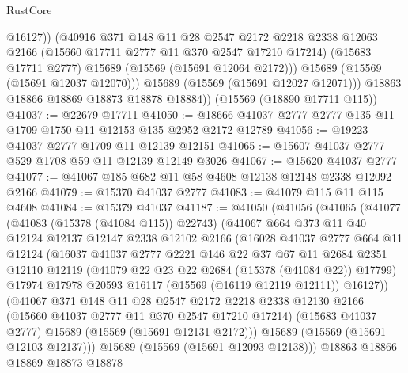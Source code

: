 \begin{lexlean}{RustCore}
\begin{coremodule}
                @16127))
            (@40916
              @371
              @148
              @11
              @28
              @2547
              @2172
              @2218
              @2338
              @12063
              @2166
              (@15660 @17711 @2777 @11 @370 @2547 @17210 @17214)
              (@15683 @17711 @2777)
              @15689
              (@15569 (@15691 @12064 @2172)))
            @15689
            (@15569 (@15691 @12037 @12070)))
          @15689
          (@15569 (@15691 @12027 @12071)))
        @18863
        @18866
        @18869
        @18873
        @18878
        @18884))
    (@15569 (@18890 @17711 @115))
@41037 := @22679 @17711
@41050 := @18666 @41037 @2777 @2777 @135 @11 @1709 @1750 @11 @12153 @135 @2952 @2172 @12789
@41056 := @19223 @41037 @2777 @1709 @11 @12139 @12151
@41065 := @15607 @41037 @2777 @529 @1708 @59 @11 @12139 @12149 @3026
@41067 := @15620 @41037 @2777
@41077 := @41067 @185 @682 @11 @58 @4608 @12138 @12148 @2338 @12092 @2166
@41079 := @15370 @41037 @2777
@41083 := @41079 @115 @11 @115 @4608
@41084 := @15379 @41037
@41187 := @41050
    (@41056
      (@41065
        (@41077
          (@41083 (@15378 (@41084 @115)) @22743)
          (@41067
            @664
            @373
            @11
            @40
            @12124
            @12137
            @12147
            @2338
            @12102
            @2166
            (@16028
              @41037
              @2777
              @664
              @11
              @12124
              (@16037
                @41037
                @2777
                @2221
                @146
                @22
                @37
                @67
                @11
                @2684
                @2351
                @12110
                @12119
                (@41079 @22 @23 @22 @2684 (@15378 (@41084 @22)) @17799)
                @17974
                @17978
                @20593
                @16117
                (@15569 (@16119 @12119 @12111))
                @16127))
            (@41067
              @371
              @148
              @11
              @28
              @2547
              @2172
              @2218
              @2338
              @12130
              @2166
              (@15660 @41037 @2777 @11 @370 @2547 @17210 @17214)
              (@15683 @41037 @2777)
              @15689
              (@15569 (@15691 @12131 @2172)))
            @15689
            (@15569 (@15691 @12103 @12137)))
          @15689
          (@15569 (@15691 @12093 @12138)))
        @18863
        @18866
        @18869
        @18873
        @18878

\end{coremodule}
\end{lexlean}

